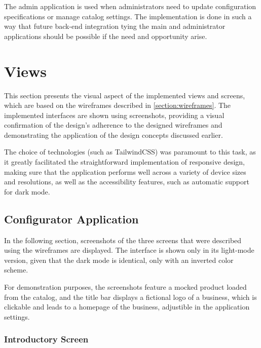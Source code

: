 The admin application is used when administrators need to update configuration specifications or manage catalog settings. The implementation is done in such a way that future back-end integration tying the main and administrator applications should be possible if the need and opportunity arise.


\section{Views}

This section presents the visual aspect of the implemented views and screens, which are based on the wireframes described in \autoref{section:wireframes}. The implemented interfaces are shown using screenshots, providing a visual confirmation of the design's adherence to the designed wireframes and demonstrating the application of the design concepts discussed earlier.

The choice of technologies (such as TailwindCSS) was paramount to this task, as it greatly facilitated the straightforward implementation of responsive design, making sure that the application performs well across a variety of device sizes and resolutions, as well as the accessibility features, such as automatic support for dark mode.


\subsection{Configurator Application}

In the following section, screenshots of the three screens that were described using the wireframes are displayed. The interface is shown only in its light-mode version, given that the dark mode is identical, only with an inverted color scheme.

For demonstration purposes, the screenshots feature a mocked product loaded from the catalog, and the title bar displays a fictional logo of a business, which is clickable and leads to a homepage of the business, adjustible in the application settings.  


\subsubsection{Introductory Screen}

